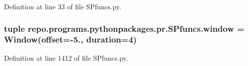 Definition at line 33 of file S\-Pfuncs.\-py.

\hypertarget{namespacerepo_1_1programs_1_1pythonpackages_1_1pr_1_1SPfuncs_a4dc94cbb119a397cfee47da5a4681676}{
\subsubsection[{window}]{\setlength{\rightskip}{0pt plus 5cm}tuple repo.\-programs.\-pythonpackages.\-pr.\-S\-Pfuncs.\-window = {\bf Window}(offset=-\/5., duration=4)}}\label{namespacerepo_1_1programs_1_1pythonpackages_1_1pr_1_1SPfuncs_a4dc94cbb119a397cfee47da5a4681676}


Definition at line 1412 of file S\-Pfuncs.\-py.

